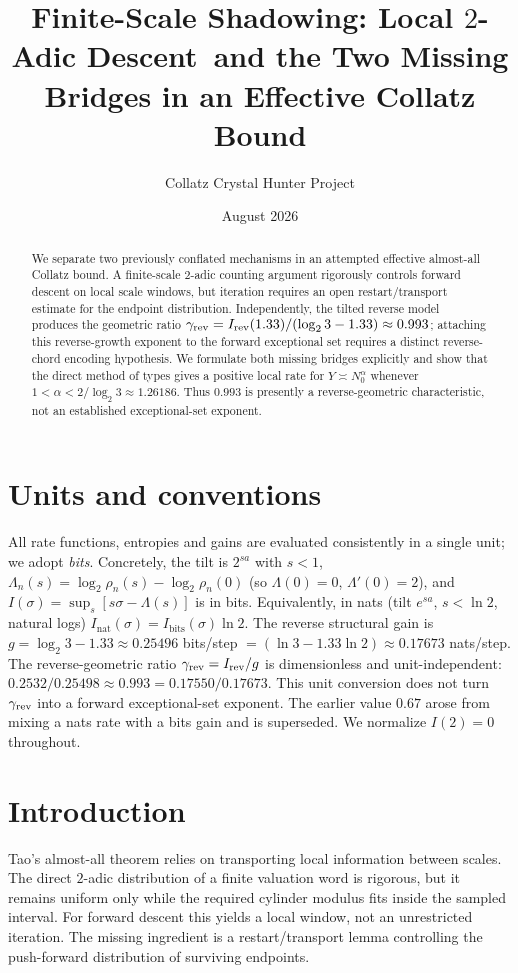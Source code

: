 \documentclass[12pt,a4paper]{article}
\title{Finite-Scale Shadowing: Local $2$-Adic Descent\
and the Two Missing Bridges in an Effective Collatz Bound}
\author{Collatz Crystal Hunter Project}
\date{August 2026}
\theoremstyle{remark}
\begin{document}
\maketitle

\begin{abstract}
We separate two previously conflated mechanisms in an attempted effective
almost-all Collatz bound.  A finite-scale $2$-adic counting argument rigorously
controls forward descent on local scale windows, but iteration requires an open
restart/transport estimate for the endpoint distribution.  Independently, the
tilted reverse model produces the geometric ratio
$\gamma_{\rm rev}=I_{\rm rev}(1.33)/(\log_2 3-1.33)\approx0.993$; attaching this
reverse-growth exponent to the forward exceptional set requires a distinct
reverse-chord encoding hypothesis.  We formulate both missing bridges
explicitly and show that the direct method of types gives a positive local rate
for $Y\asymp N_0^\alpha$ whenever
$1<\alpha<2/\log_2 3\approx1.26186$.  Thus $0.993$ is presently a
reverse-geometric characteristic, not an established exceptional-set exponent.
\end{abstract}

\section*{Units and conventions}
All rate functions, entropies and gains are evaluated consistently in a single
unit; we adopt \emph{bits}. Concretely, the tilt is $2^{s a}$ with $s<1$,
$\Lambda_n(s)=\log_2\rho_n(s)-\log_2\rho_n(0)$ (so $\Lambda(0)=0$, $\Lambda'(0)=2$),
and $I(\sigma)=\sup_s[s\sigma-\Lambda(s)]$ is in bits. Equivalently, in nats
(tilt $e^{sa}$, $s<\ln2$, natural logs) $I_{\mathrm{nat}}(\sigma)=I_{\mathrm{bits}}(\sigma)\ln2$.
The reverse structural gain is $g=\log_2 3-1.33\approx0.25496$ bits/step
$=(\ln3-1.33\ln2)\approx0.17673$ nats/step.  The reverse-geometric ratio
$\gamma_{\rm rev}=I_{\rm rev}/g$ is dimensionless and unit-independent:
$0.2532/0.25498\approx0.993=0.17550/0.17673$.  This unit conversion does not turn
$\gamma_{\rm rev}$ into a forward exceptional-set exponent.  The earlier value
$0.67$ arose from mixing a nats rate with a bits gain and is superseded.  We
normalize $I(2)=0$ throughout.

\section*{Introduction}
Tao's almost-all theorem relies on transporting local information between
scales.  The direct $2$-adic distribution of a finite valuation word is
rigorous, but it remains uniform only while the required cylinder modulus fits
inside the sampled interval.  For forward descent this yields a local window,
not an unrestricted iteration.  The missing ingredient is a restart/transport
lemma controlling the push-forward distribution of surviving endpoints.
\end{document}
